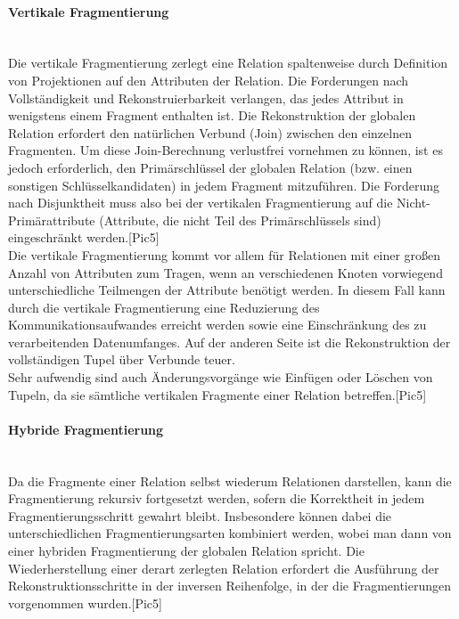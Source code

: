 \documentclass[letterpaper, 12pt]{article}
\begin{document}
\paragraph{Vertikale Fragmentierung\\\\}
Die vertikale Fragmentierung zerlegt eine Relation spaltenweise durch Definition von Projektionen auf den Attributen der Relation. Die Forderungen nach Vollständigkeit und Rekonstruierbarkeit verlangen, das jedes Attribut in wenigstens einem Fragment enthalten ist. Die Rekonstruktion der globalen Relation erfordert den natürlichen Verbund (Join) zwischen den einzelnen Fragmenten. Um diese Join-Berechnung verlustfrei vornehmen zu können, ist es jedoch erforderlich, den Primärschlüssel der globalen Relation (bzw. einen sonstigen Schlüsselkandidaten) in jedem Fragment mitzuführen. Die Forderung nach Disjunktheit muss also bei der vertikalen Fragmentierung auf die Nicht-Primärattribute (Attribute, die nicht Teil des Primärschlüssels sind) eingeschränkt werden.[Pic5]
\\
Die vertikale Fragmentierung kommt vor allem für Relationen mit einer großen Anzahl von Attributen zum Tragen, wenn an verschiedenen Knoten vorwiegend unterschiedliche Teilmengen der Attribute benötigt werden. In diesem Fall kann durch die vertikale Fragmentierung eine Reduzierung des Kommunikationsaufwandes erreicht werden sowie eine Einschränkung des zu verarbeitenden Datenumfanges. Auf der anderen Seite ist die Rekonstruktion der vollständigen Tupel über Verbunde teuer. \\Sehr aufwendig sind auch Änderungsvorgänge wie Einfügen oder Löschen von Tupeln, da sie sämtliche vertikalen Fragmente einer Relation betreffen.[Pic5]
\paragraph{Hybride Fragmentierung\\\\}
Da die Fragmente einer Relation selbst wiederum Relationen darstellen, kann die Fragmentierung rekursiv fortgesetzt werden, sofern die Korrektheit in jedem Fragmentierungsschritt gewahrt bleibt. Insbesondere können dabei die unterschiedlichen Fragmentierungsarten kombiniert werden, wobei man dann von einer hybriden Fragmentierung der globalen Relation spricht. Die Wiederherstellung einer derart zerlegten Relation erfordert die Ausführung der Rekonstruktionsschritte in der inversen Reihenfolge, in der die Fragmentierungen vorgenommen wurden.[Pic5]
\end{document}
